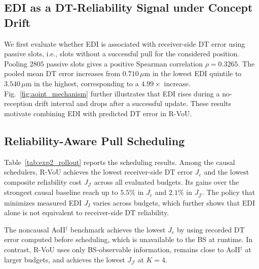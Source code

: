 \documentclass[conference]{IEEEtran}
\begin{document}
\vspace{-1.9mm}
\subsection{EDI as a DT-Reliability Signal under Concept Drift}

We first evaluate whether EDI is associated with receiver-side DT error
using passive slots, i.e., slots without a successful pull for the considered
position. Pooling \(2805\) passive slots gives a positive Spearman correlation
\(\rho=0.3265\). The pooled mean DT error increases
from \(0.710\,\mu\mathrm{m}\) in the lowest EDI quintile to
\(3.540\,\mu\mathrm{m}\) in the highest, corresponding to a \(4.99\times\)
increase. Fig.~\ref{fig:aoint_mechanism} further illustrates that EDI rises
during a no-reception drift interval and drops after a successful update. These
results motivate combining EDI with predicted DT error in R-VoU.
\vspace{-1.6mm}
\subsection{Reliability-Aware Pull Scheduling}
\vspace{-0.3mm}
Table~\ref{tab:exp2_rollout} reports the scheduling results. Among the
causal schedulers, R-VoU achieves the lowest receiver-side DT error \(J_e\)
and the lowest composite reliability cost \(J_{\mathcal J}\) across all
evaluated budgets. Its gains over the strongest causal baseline reach up to
\(5.5\%\) in \(J_e\) and \(2.1\%\) in \(J_{\mathcal J}\). The policy that
minimizes measured EDI \(J_I\) varies across budgets, which further shows
that EDI alone is not equivalent to receiver-side DT reliability.

The noncausal AoII\(^{\dagger}\) benchmark achieves the lowest \(J_e\) by using recorded DT error computed before scheduling, which is unavailable to the BS at runtime. In contrast, R-VoU uses only BS-observable
information, remains close to AoII\(^{\dagger}\) at larger budgets, and
achieves the lowest \(J_{\mathcal J}\) at \(K=4\).
\end{document}

